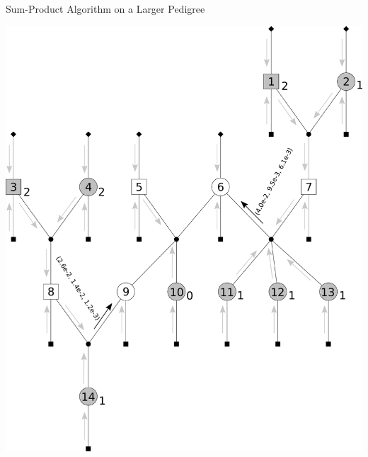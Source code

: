 \documentclass[letter,graphicx]{beamer}
\begin{document}
\begin{frame}{Sum-Product Algorithm on a Larger Pedigree} 
\begin{center} 
\includegraphics[height = 0.8\textheight]{./images/mg-example-step5.pdf} 
\end{center}
\end{frame}
\end{document}
